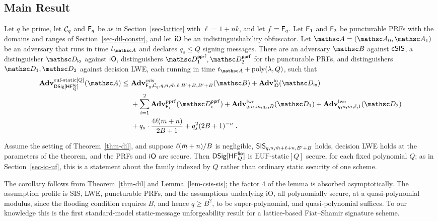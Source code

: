 \subsection{Main Result} \label{sec-dil-thm}

\begin{theorem} \label{thm-dil}
Let $q$ be prime, let $\mathcal{C}_q$ and $\mathsf{F}_q$ be as in Section~\ref{sec-lattice} with $\ell = 1+nk$, and let $f = \mathsf{F}_q$. Let $\mathsf{F}_1$ and $\mathsf{F}_2$ be puncturable PRFs with the domains and ranges of Section~\ref{sec-dil-constr}, and let $\mathsf{iO}$ be an indistinguishability obfuscator. Let $\advA = (\advA_0, \advA_1)$ be an adversary that runs in time $t_{\advA}$ and declares $q_s \le Q$ signing messages. There are an adversary $\advB$ against $\mathsf{cSIS}$, a distinguisher $\advD_{\mathsf{io}}$ against $\mathsf{iO}$, distinguishers $\advD^{\mathsf{pprf}}_1, \advD^{\mathsf{pprf}}_2$ for the puncturable PRFs, and distinguishers $\advD_1, \advD_2$ against decision LWE, each running in time $t_{\advA} + \poly(\secp, Q)$, such that
$$
\begin{aligned}
\AdvEUFSTATICQ{\DSScheme[\HF^{\mathsf{lio}}_Q]}{\advA}
\le\ &\AdvCSIS{\Fq_q,\chal_q,q,n,\colsA,\ell,\Bclip+B,\Bclip+B}{\advB}
+ \AdvIO{\iO}{\advD_{\mathsf{io}}} \\
&+ \sum_{i=1}^{2}\AdvPPRF{\PRF_i}{\advD^{\mathsf{pprf}}_i}
+ \AdvLWE{q,n,\colsA,q_s,B}{\advD_1}
+ \AdvLWE{q,n,\colsA,\ell,1}{\advD_2} \\
&+ q_s \cdot \frac{4\ell(\colsA+n)}{2B+1}
+ q_s^2(2B+1)^{-n} \;.
\end{aligned}
$$
\end{theorem}

\begin{corollary} \label{cor-dil-sis}
Assume the setting of Theorem~\ref{thm-dil}, and suppose $\ell(\bar m+n)/B$ is negligible, $\mathsf{SIS}_{q,n,\bar m+\ell+n,B'+B}$ holds, decision LWE holds at the parameters of the theorem, and the PRFs and $\mathsf{iO}$ are secure. Then $\mathsf{DSig}[\mathsf{HF}^{\mathsf{lio}}_Q]$ is $\mathrm{EUF\text{-}static}[Q]$ secure, for each fixed polynomial $Q$; as in Section~\ref{sec-io-uf}, this is a statement about the family indexed by $Q$ rather than ordinary static security of one scheme.
\end{corollary}

The corollary follows from Theorem~\ref{thm-dil} and Lemma~\ref{lem-csis-sis}; the factor $4$ of the lemma is absorbed asymptotically. The assumption profile is SIS, LWE, puncturable PRFs, and the assumptions underlying iO, all polynomially secure, at a quasi-polynomial modulus, since the flooding condition requires $B$, and hence $q \ge B^2$, to be super-polynomial, and quasi-polynomial suffices. To our knowledge this is the first standard-model static-message unforgeability result for a lattice-based Fiat--Shamir signature scheme.

